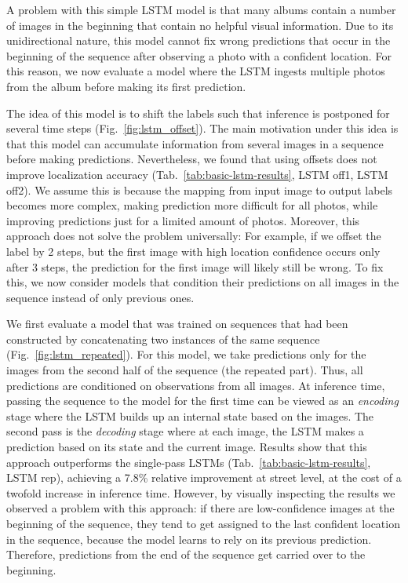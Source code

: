 \documentclass[10pt,twocolumn,letterpaper]{article}
\begin{document}
A problem with this simple LSTM model is that many albums contain a
number of images in the beginning that contain no helpful visual
information. Due to its unidirectional nature, this model cannot fix
wrong predictions that occur in the beginning of the sequence after
observing a photo with a confident location. For this reason, we now
evaluate a model where the LSTM ingests multiple photos from the album
before making its first prediction.

The idea of this model is to shift the labels such that inference is postponed for several time steps (Fig.~\ref{fig:lstm_offset}). The main motivation under this idea is that this model can accumulate information from several images in a sequence before making predictions. Nevertheless, we found that using offsets does not improve localization accuracy (Tab.~\ref{tab:basic-lstm-results}, LSTM off1, LSTM off2). We assume this is because the mapping from input image to output labels becomes more complex, making prediction more difficult for all photos, while improving predictions just for a limited amount of photos. Moreover, this approach does not solve the problem universally: For example, if we offset the label by 2 steps, but the first image with high location confidence occurs only after 3 steps, the prediction for the first image will likely still be wrong. To fix this, we now consider models that condition their predictions on all images in the sequence instead of only previous ones.

We first evaluate a model that was trained on sequences that had been constructed by concatenating two instances of the same sequence (Fig.~\ref{fig:lstm_repeated}). For this model, we take predictions only for the images from the second half of the sequence (\ie the repeated part). Thus, all predictions are conditioned on observations from all images. At inference time, passing the sequence to the model for the first time can be viewed as an \emph{encoding} stage where the LSTM builds up an internal state based on the images. The second pass is the \emph{decoding} stage where at each image, the LSTM makes a prediction based on its state and the current image. Results show that this approach outperforms the single-pass LSTMs (Tab.~\ref{tab:basic-lstm-results}, LSTM rep), achieving a 7.8\% relative improvement at street level, at the cost of a twofold increase in inference time. However, by visually inspecting the results we observed a problem with this approach: if there are low-confidence images at the beginning of the sequence, they tend to get assigned to the last confident location in the sequence, because the model learns to rely on its previous prediction. Therefore, predictions from the end of the sequence get carried over to the beginning.
\end{document}
